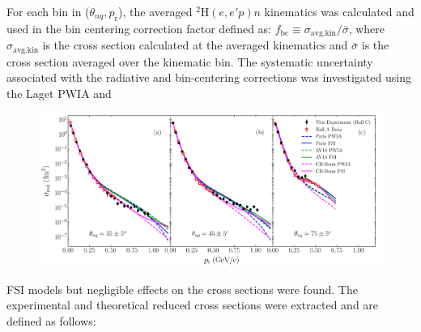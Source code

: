 For each bin in ($\theta_{nq}, p_{\mathrm{r}}$), the averaged $^{2}\mathrm{H}(e,e'p)n$ kinematics was calculated and used in the bin centering correction factor defined as:
$f_{\mathrm{bc}} \equiv \sigma_{\mathrm{avg.kin}} / \bar{\sigma}$, where $\sigma_{\mathrm{avg.kin}}$ is the cross section calculated at the averaged kinematics and $\bar{\sigma}$ is the cross section averaged
over the kinematic bin. The systematic uncertainty associated with the radiative and bin-centering corrections was investigated using the \DIFdelbegin {}\DIFdelend Laget PWIA and 
\DIFaddbegin \onecolumngrid
\begin{center}
\begin{figure}
\includegraphics[scale=0.46]{prl_plots/PRL_plot1.pdf}
\caption{}
\label{fig:fig1}
\end{figure}
\end{center}
\twocolumngrid
\noindent \DIFaddend FSI models but negligible effects on the cross sections were found. \DIFdelbegin %
\DIFdelend The experimental and theoretical reduced cross sections were extracted and are defined as follows:
\DIFdelbegin %
